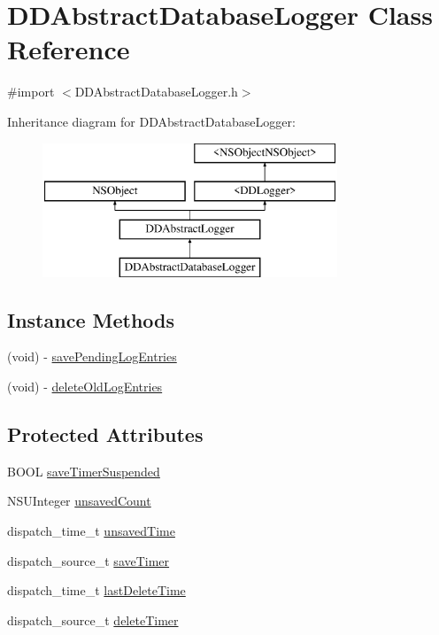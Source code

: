 \hypertarget{interface_d_d_abstract_database_logger}{\section{D\-D\-Abstract\-Database\-Logger Class Reference}
\label{interface_d_d_abstract_database_logger}
}


{\ttfamily \#import $<$D\-D\-Abstract\-Database\-Logger.\-h$>$}

Inheritance diagram for D\-D\-Abstract\-Database\-Logger\-:\begin{figure}[H]
\begin{center}
\leavevmode
\includegraphics[height=4.000000cm]{interface_d_d_abstract_database_logger}
\end{center}
\end{figure}
\subsection*{Instance Methods}
\begin{DoxyCompactItemize}
\item 
(void) -\/ \hyperlink{interface_d_d_abstract_database_logger_aaeb05a38ed741dc600b2d9a2fe508caf}{save\-Pending\-Log\-Entries}
\item 
(void) -\/ \hyperlink{interface_d_d_abstract_database_logger_aae5b9fa0ac538ab0d03dca012ff26001}{delete\-Old\-Log\-Entries}
\end{DoxyCompactItemize}
\subsection*{Protected Attributes}
\begin{DoxyCompactItemize}
\item 
B\-O\-O\-L \hyperlink{interface_d_d_abstract_database_logger_ab32407a62b4aa0e3ee5008613b4e62a6}{save\-Timer\-Suspended}
\item 
N\-S\-U\-Integer \hyperlink{interface_d_d_abstract_database_logger_a121327bc349a8f298853f136ccb1e487}{unsaved\-Count}
\item 
dispatch\-\_\-time\-\_\-t \hyperlink{interface_d_d_abstract_database_logger_a67eec7235264678ca755027f731afcd4}{unsaved\-Time}
\item 
dispatch\-\_\-source\-\_\-t \hyperlink{interface_d_d_abstract_database_logger_a89bac726725c8ee3c52cbf1ebe0c2893}{save\-Timer}
\item 
dispatch\-\_\-time\-\_\-t \hyperlink{interface_d_d_abstract_database_logger_a36b383ca4e0009b019d2eb7be34339be}{last\-Delete\-Time}
\item 
dispatch\-\_\-source\-\_\-t \hyperlink{interface_d_d_abstract_database_logger_a8803148510f94049709971b07a80165f}{delete\-Timer}
\end{DoxyCompactItemize}
